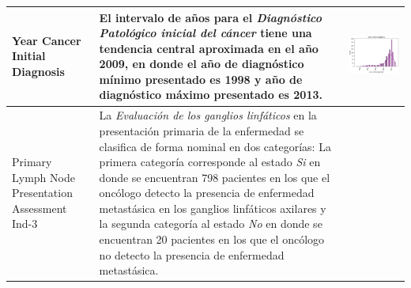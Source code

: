 \begin{table}[!htb]
	\footnotesize
	\begin{threeparttable}
		\begin{tabular}{p{2.5cm} p{7cm} p{6.5cm}} \toprule
			
			Year Cancer Initial Diagnosis
			& El intervalo de años para el \textit{Diagnóstico Patológico inicial del cáncer} tiene una tendencia central aproximada en el año 2009, en donde el año de diagnóstico mínimo presentado es 1998 y año de diagnóstico máximo presentado es 2013.
			
			& \begin{center}\includegraphics[width=1\linewidth]{NOTEBOOK/IMAGENES_DESCRIPTIVAS/21_year_initial_diagnosis}\end{center}
			\\ \hline
			
			Primary Lymph Node Presentation Assessment Ind-3
			& La \textit{Evaluación de los ganglios linfáticos} en la presentación primaria de la enfermedad se clasifica de forma nominal en dos categorías: La primera categoría corresponde al estado \textit{Si} en donde se encuentran 798 pacientes en los que el oncólogo detecto la presencia de enfermedad metastásica en los ganglios linfáticos axilares y la segunda categoría al estado \textit{No} en donde se encuentran 20 pacientes en los que el oncólogo no detecto la presencia de enfermedad metastásica.
			

\end{tabular}
\end{threeparttable}
\end{table}
